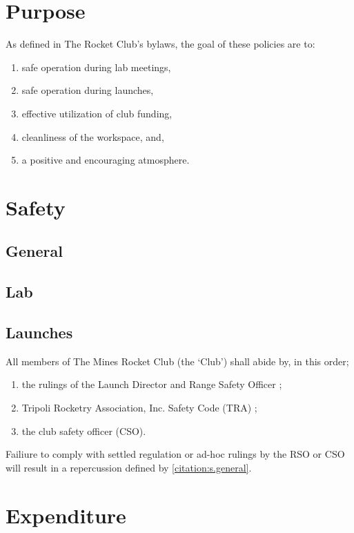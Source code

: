 \documentclass[12pt]{article}
\newcommand{\note}[1]{\raisebox{.5em}{\small Note #1}}
\begin{document}
\newline

\clearpage
\tableofcontents
\clearpage
\section{Purpose}
As defined in The Rocket Club's bylaws, the goal of these policies are to:
\begin{enumerate}[label=(\roman*)]
    \item safe operation during lab meetings,
    \item safe operation during launches,
    \item effective utilization of club funding,
    \item cleanliness of the workspace, and,
    \item a positive and encouraging atmosphere.
\end{enumerate}
\section{Safety}
\subsection{General}
\subsection{Lab}
\subsection{Launches}
All members of The Mines Rocket Club (the `Club') shall abide by, in this order;
\begin{enumerate}[label=(\roman*)]
    \item the rulings of the Launch Director and Range Safety Officer \note{1,2};
    \item Tripoli Rocketry Association, Inc. Safety Code (TRA) \note{1};
    \item the club safety officer (CSO).
\end{enumerate}
Failiure to comply with settled regulation or ad-hoc rulings by the RSO or CSO will result in a repercussion defined by \cref{citation:s.general}.
\section{Expenditure}
\end{document}
